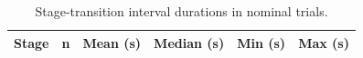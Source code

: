 \begin{table}[H]
\centering
\caption{Stage-transition interval durations in nominal trials.}
\label{tab:v21_stage_timing}
\renewcommand{\arraystretch}{1.3}
\setlength{\tabcolsep}{8pt}

\begin{tabular}{|l|c|c|c|c|c|}
\hline
\textbf{Stage} & \textbf{n} & \textbf{Mean (s)} & \textbf{Median (s)} & \textbf{Min (s)} & \textbf{Max (s)} \\
\hline
\end{tabular}
\end{table}